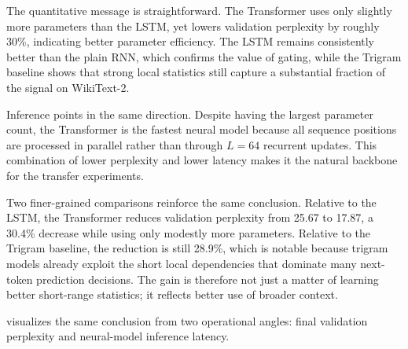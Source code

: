 \documentclass[10pt,a4paper]{article}
\begin{document}
The quantitative message is straightforward. The Transformer uses only slightly more parameters than the LSTM, yet lowers validation perplexity by roughly 30\%, indicating better parameter efficiency. The LSTM remains consistently better than the plain RNN, which confirms the value of gating, while the Trigram baseline shows that strong local statistics still capture a substantial fraction of the signal on WikiText-2.

Inference points in the same direction. Despite having the largest parameter count, the Transformer is the fastest neural model because all sequence positions are processed in parallel rather than through $L=64$ recurrent updates. This combination of lower perplexity and lower latency makes it the natural backbone for the transfer experiments.

Two finer-grained comparisons reinforce the same conclusion. Relative to the LSTM, the Transformer reduces validation perplexity from 25.67 to 17.87, a 30.4\% decrease while using only modestly more parameters. Relative to the Trigram baseline, the reduction is still 28.9\%, which is notable because trigram models already exploit the short local dependencies that dominate many next-token prediction decisions. The gain is therefore not just a matter of learning better short-range statistics; it reflects better use of broader context.

 visualizes the same conclusion from two operational angles: final validation perplexity and neural-model inference latency.
\end{document}

